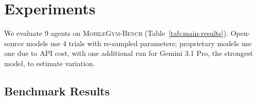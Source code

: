 \documentclass{llmxive}
\providecommand{\bench}{\textsc{MobileGym-Bench}}
\begin{document}
\section{Experiments}\label{sec:exp}

We evaluate 9 agents on \bench{} (Table~\ref{tab:main-results}). Open-source models use 4 trials with re-sampled parameters; proprietary models use one due to API cost, with one additional run for Gemini 3.1 Pro, the strongest model, to estimate variation.

\subsection{Benchmark Results}\label{sec:exp:bench}
\end{document}
